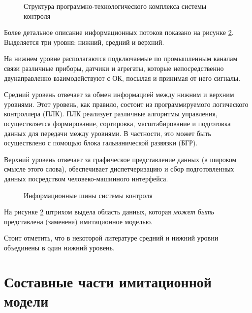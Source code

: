 \begin{center}
    \begin{figure}[hb]
        \caption{Структура программно-технологического комплекса системы контроля}\label{fig:asc_schema}
    \end{figure}
\end{center}

Более детальное описание информационных потоков показано на рисунке \ref{fig:asc_info_bus}.
Выделяется три уровня: нижний, средний и верхний.

На нижнем уровне располагаются подключаемые по промышленным каналам связи различные приборы, датчики и агрегаты,
которые непосредственно двунаправленно взаимодействуют с ОК, посылая и принимая от него сигналы.

Средний уровень отвечает за обмен информацией между нижним и верхним уровнями. Этот уровень, как правило,
состоит из программируемого логического контроллера (ПЛК). ПЛК реализует различные алгоритмы управления,
осуществляется формирование, сортировка, масштабирование и подготовка данных для передачи между уровнями.
В частности, это может быть осуществлено с помощью блока гальванической развязки (БГР).

Верхний уровень отвечает за графическое представление данных (в широком смысле этого слова),
обеспечивает диспетчеризацию и сбор подготовленных данных посредством человеко-машинного интерфейса.

\begin{center}
    \begin{figure}[hb]
        \caption{Информационные шины системы контроля}\label{fig:asc_info_bus}
    \end{figure}
\end{center}

На рисунке \ref{fig:asc_info_bus} штрихом выдела область данных, которая \textit{может быть}
представлена (заменена) имитационное моделью.

Стоит отметить, что в некоторой литературе средний и нижний уровни объединены в один нижний уровень.

\section{Составные части имитационной модели}




